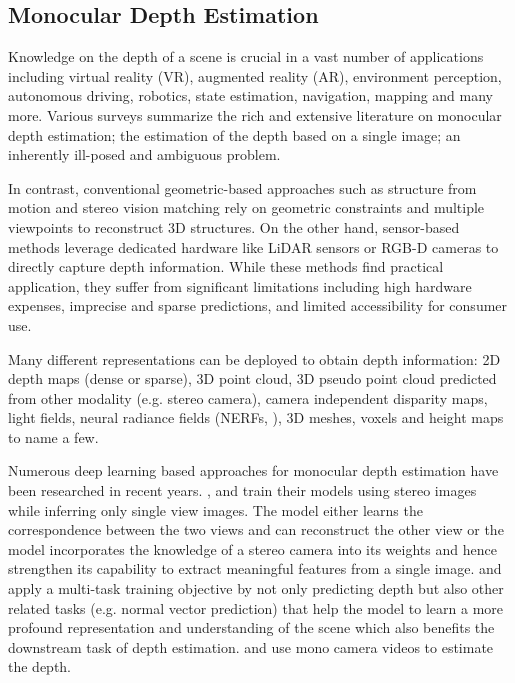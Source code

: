\subsection{Monocular Depth Estimation} Knowledge on the depth of a scene is crucial in a vast number of applications including virtual reality (VR), augmented reality (AR), environment perception, autonomous driving, robotics, state estimation, navigation, mapping and many more. Various surveys \citep{bhoi_monocular_2019,zhao_monocular_2020,ming_deep_2021, masoumian_monocular_2022} summarize the rich and extensive literature on monocular depth estimation; the estimation of the depth based on a single image; an inherently ill-posed and ambiguous problem.

In contrast, conventional geometric-based approaches such as structure from motion and stereo vision matching rely on geometric constraints and multiple viewpoints to reconstruct 3D structures. On the other hand, sensor-based methods leverage dedicated hardware like LiDAR sensors or RGB-D cameras to directly capture depth information. While these methods find practical application, they suffer from significant limitations including high hardware expenses, imprecise and sparse predictions, and limited accessibility for consumer use.

Many different representations can be deployed to obtain depth information: 2D depth maps (dense or sparse), 3D point cloud, 3D pseudo point cloud predicted from other modality (e.g. stereo camera), camera independent disparity maps, light fields, neural radiance fields (NERFs, \cite{mildenhall2021nerf}), 3D meshes, voxels and height maps to name a few.

Numerous deep learning based approaches for monocular depth estimation have been researched in recent years. 
\cite{lu_self-supervised_2022}, \cite{chen_self-supervised_2018} and \cite{zhang_unsupervised_2020} train their models using stereo images while inferring only single view images. The model either learns the correspondence between the two views and can reconstruct the other view or the model incorporates the knowledge of a stereo camera into its weights and hence strengthen its capability to extract meaningful features from a single image. \cite{yue_self-supervised_2022} and \cite{ zhao_joint_2022} apply a multi-task training objective by not only predicting depth but also other related tasks (e.g. normal vector prediction) that help the model to learn a more profound representation and understanding of the scene which also benefits the downstream task of depth estimation.
\cite{watson_temporal_2021} and \cite{bian_unsupervised_2021} use mono camera videos to estimate the depth.

